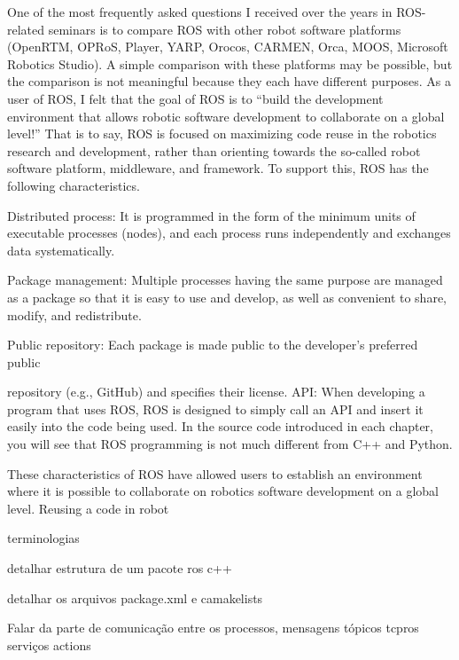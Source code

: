 One of the most frequently asked questions I received over the years in ROS-related seminars is
to compare ROS with other robot software platforms (OpenRTM, OPRoS, Player, YARP, Orocos,
CARMEN, Orca, MOOS, Microsoft Robotics Studio). A simple comparison with these platforms
may be possible, but the comparison is not meaningful because they each have different
purposes. As a user of ROS, I felt that the goal of ROS is to “build the development environment
that allows robotic software development to collaborate on a global level!” That is to say, ROS
is focused on maximizing code reuse in the robotics research and development, rather than
orienting towards the so-called robot software platform, middleware, and framework. To
support this, ROS has the following characteristics.


Distributed process: It is programmed in the form of the minimum units of executable
processes (nodes), and each process runs independently and exchanges data systematically.

Package management: Multiple processes having the same purpose are managed as a 
package so that it is easy to use and develop, as well as convenient to share, modify, and
redistribute.

Public repository: Each package is made public to the developer’s preferred public

repository (e.g., GitHub) and specifies their license.
API: When developing a program that uses ROS, ROS is designed to simply call an API and
insert it easily into the code being used. In the source code introduced in each chapter, you
will see that ROS programming is not much different from C++ and Python.

These characteristics of ROS have allowed users to establish an environment where it is
possible to collaborate on robotics software development on a global level. Reusing a code in
robot

terminologias

detalhar estrutura de um pacote ros c++ \cite{RosPKG}

detalhar os arquivos package.xml e camakelists


Falar da parte de comunicação entre os processos, 
mensagens
tópicos
tcpros
serviços
actions
